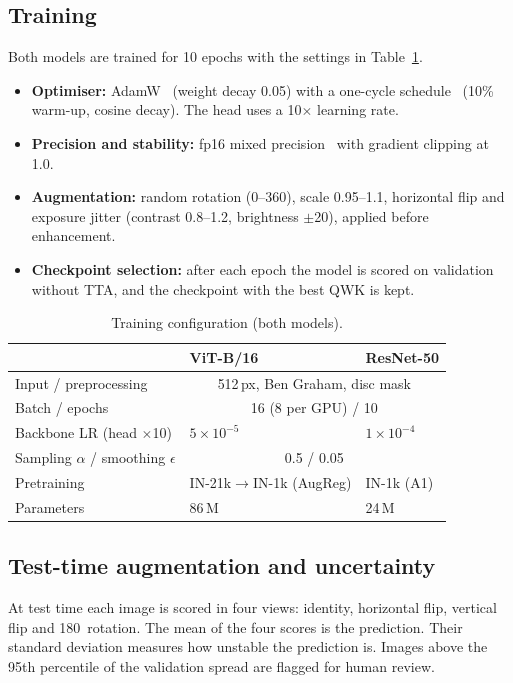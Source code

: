 \documentclass[conference,a4paper]{IEEEtran}
\begin{document}
\subsection{Training}
Both models are trained for 10 epochs with the settings in Table~\ref{tab:hparams}.
\begin{itemize}
\item \textbf{Optimiser:} AdamW~\cite{adamw} (weight decay 0.05) with a one-cycle schedule~\cite{onecycle} (10\% warm-up, cosine decay). The head uses a 10$\times$ learning rate.
\item \textbf{Precision and stability:} fp16 mixed precision~\cite{amp} with gradient clipping at 1.0.
\item \textbf{Augmentation:} random rotation (0--360\textdegree), scale 0.95--1.1, horizontal flip and exposure jitter (contrast 0.8--1.2, brightness $\pm$20), applied before enhancement.
\item \textbf{Checkpoint selection:} after each epoch the model is scored on validation without TTA, and the checkpoint with the best QWK is kept.
\end{itemize}

\begin{table}[t]
\centering\caption{Training configuration (both models).}\label{tab:hparams}
\footnotesize
\begin{tabular}{@{}lll@{}}
\toprule
 & ViT-B/16 & ResNet-50\\
\midrule
Input / preprocessing & \multicolumn{2}{c}{512\,px, Ben Graham, disc mask}\\
Batch / epochs & \multicolumn{2}{c}{16 (8 per GPU) / 10}\\
Backbone LR (head $\times$10) & $5\times10^{-5}$ & $1\times10^{-4}$\\
Sampling $\alpha$ / smoothing $\epsilon$ & \multicolumn{2}{c}{0.5 / 0.05}\\
Pretraining & IN-21k$\rightarrow$IN-1k (AugReg) & IN-1k (A1)\\
Parameters & 86\,M & 24\,M\\
\bottomrule
\end{tabular}
\end{table}

\subsection{Test-time augmentation and uncertainty}
At test time each image is scored in four views: identity, horizontal flip, vertical flip and 180\textdegree\ rotation.
The mean of the four scores is the prediction. Their standard deviation measures how unstable the prediction is.
Images above the 95th percentile of the validation spread are flagged for human review.
\end{document}
